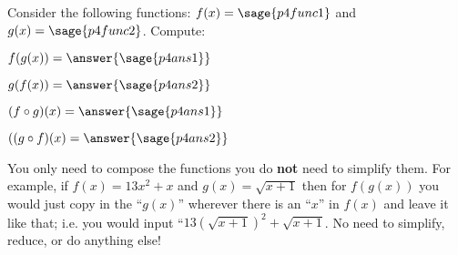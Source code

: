 \documentclass{ximera}
\begin{document}
\begin{problem}
Consider the following functions: $f(x) = \sage{p4func1}$ and $g(x) = \sage{p4func2}$. Compute:

$f(g(x)) = \answer{\sage{p4ans1}}$

$g(f(x)) = \answer{\sage{p4ans2}}$

$(f\circ g)(x) = \answer{\sage{p4ans1}}$

$((g\circ f)(x) = \answer{\sage{p4ans2}}$

\begin{feedback}
    You only need to compose the functions you do \textbf{not} need to simplify them. For example, if $f(x) = 13x^2 + x$ and $g(x) = \sqrt{x+1}$ then for $f(g(x))$ you would just copy in the ``$g(x)$'' wherever there is an ``$x$'' in $f(x)$ and leave it like that; i.e. you would input ``$13(\sqrt{x+1})^2 + \sqrt{x+1}$. No need to simplify, reduce, or do anything else!
\end{feedback}
\end{problem}
\end{document}
